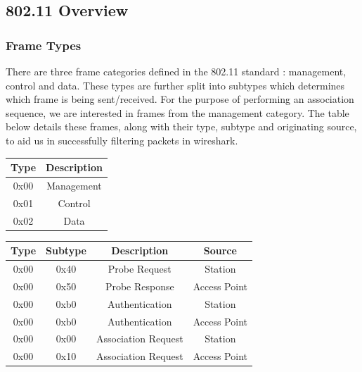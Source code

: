 \subsection{802.11 Overview}
\subsubsection{Frame Types}
There are three frame categories defined in the 802.11 standard \cite{research:80211_standard}: management, control and data. These types are further split into subtypes which determines which frame is being sent/received. For the purpose of performing an association sequence, we are interested in frames from the management category. The table below details these frames, along with their type, subtype and originating source, to aid us in successfully filtering packets in wireshark.

\begin{table}[h!]
\begin{center}
	\begin{tabular}{| c | c |}
		\hline
		\textbf{Type} & \textbf{Description} \\ \hline
		0x00 & Management \\ \hline
		0x01 & Control \\ \hline
		0x02 & Data \\ \hline
	\end{tabular}
	
\end{center}
\end{table}
\begin{table}[h!]
\begin{center}
	\begin{tabular}{| c | c | c | c |}
		\hline
		\textbf{Type} & \textbf{Subtype} &  \textbf{Description} &  \textbf{Source} \\ \hline
		0x00 & 0x40 & Probe Request & Station \\ \hline
		0x00 & 0x50 & Probe Response & Access Point \\ \hline
		0x00 & 0xb0 & Authentication & Station \\ \hline
		0x00 & 0xb0 & Authentication & Access Point \\ \hline
		0x00 & 0x00 & Association Request & Station \\ \hline
		0x00 & 0x10 & Association Request & Access Point \\ \hline
	\end{tabular}
\end{center}
\end{table}

